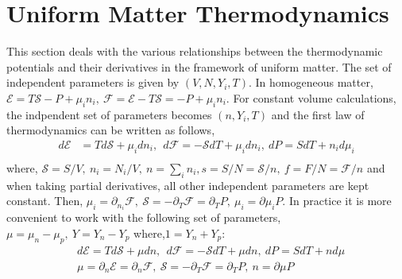 \documentclass[11pt,letter]{article}
\begin{document}
\section{Uniform Matter Thermodynamics}
This section deals with the various relationships between the thermodynamic potentials and their derivatives in the framework of uniform matter.
The set of independent parameters is given by $(V,N,Y_i,T)$.
In homogeneous matter, $\mathcal{E}=T\mathcal{S} -P+ \mu_i n_i,\ \mathcal{F} =\mathcal{E} - T\mathcal{S} = -P + \mu_i n_i$.
For constant volume calculations, the indpendent set of parameters becomes 
$(n,Y_i,T)$ and the first law of thermodynamics can be written
as follows,
\begin{equation}
 \begin{split}
  d\mathcal{E}&=Td\mathcal{S}+\mu_i d n_i,\ \ d\mathcal{F} = -\mathcal{S}dT+\mu_i d n_i,\ dP = S dT + n_i d\mu_i\\
 \end{split}
\end{equation}
where, $ \mathcal{S}= S/V,\ n_i=N_i/V,\ n = \sum_i n_i, s= S/N = \mathcal{S}/n,\ f= F/N=\mathcal{F}/n$ and when taking partial derivatives, all other 
independent parameters are kept constant.
Then, $ \mu_i =\partial_{n_i}\mathcal{F},\  \mathcal{S}=-\partial_{T}\mathcal{F}=\partial_T P, \ \mu_i = \partial \mu_i P$.
In practice it is more convenient to work with the following set of parameters, $\mu=\mu_n-\mu_p,\ Y = Y_n-Y_p$ where,$1 = Y_n+Y_p$:
\begin{equation}
 \begin{split}
  &d\mathcal{E}=Td\mathcal{S}+\mu d n,\ \ d\mathcal{F} = -\mathcal{S}dT+\mu d n,\ dP = S dT + n d\mu\\
  &\mu =\partial_{n}\mathcal{E}=\partial_{n}\mathcal{F},\  \mathcal{S}=-\partial_{T}\mathcal{F}=\partial_T P, \ n = \partial \mu P
 \end{split}
\end{equation}
\end{document}
